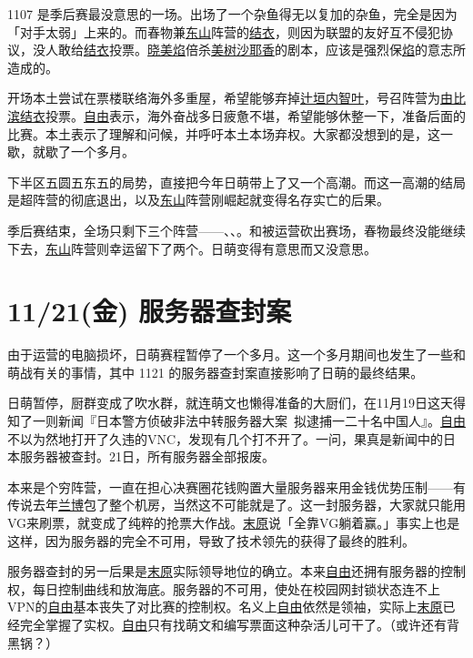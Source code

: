 1107 是季后赛最没意思的一场。出场了一个杂鱼得无以复加的杂鱼，完全是因为「对手太弱」上来的。而春物兼\uline{东山}阵营的\uline{结衣}，则因为联盟的友好互不侵犯协议，没人敢给\uline{结衣}投票。\uline{晓美焰}倍杀\uline{美树沙耶香}的剧本，应该是强烈保\uline{焰}的意志所造成的。

开场本土尝试在票楼联络海外多重屋，希望能够弃掉\uline{辻垣内智叶}，号召阵营为\uline{由比滨结衣}投票。\uline{自由}表示，海外奋战多日疲惫不堪，希望能够休整一下，准备后面的比赛。本土表示了理解和问候，并呼吁本土本场弃权。大家都没想到的是，这一歇，就歇了一个多月。

下半区五圆五东五的局势，直接把今年日萌带上了又一个高潮。而这一高潮的结局是超阵营的彻底退出，以及\uline{东山}阵营刚崛起就变得名存实亡的后果。

季后赛结束，全场只剩下三个阵营——、、。和被运营砍出赛场，春物最终没能继续下去，\uline{东山}阵营则幸运留下了两个。日萌变得有意思而又没意思。
\newpage
\section{11/21(金) 服务器查封案}

由于运营的电脑损坏，日萌赛程暂停了一个多月。这一个多月期间也发生了一些和萌战有关的事情，其中 1121 的服务器查封案直接影响了日萌的最终结果。

日萌暂停，厨群变成了吹水群，就连萌文也懒得准备的大厨们，在11月19日这天得知了一则新闻『日本警方侦破非法中转服务器大案~拟逮捕一二十名中国人』。\uline{自由}不以为然地打开了久违的VNC，发现有几个打不开了。一问，果真是新闻中的日本服务器被查封。21日，所有服务器全部报废。

本来是个穷阵营，一直在担心决赛圈花钱购置大量服务器来用金钱优势压制——有传说去年\uline{兰博}包了整个机房，当然这不可能就是了。这一封服务器，大家就只能用VG来刷票，就变成了纯粹的抢票大作战。\uline{末原}说「全靠VG躺着赢。」事实上也是这样，因为服务器的完全不可用，导致了技术领先的获得了最终的胜利。

服务器查封的另一后果是\uline{末原}实际领导地位的确立。本来\uline{自由}还拥有服务器的控制权，每日控制曲线和放海底。服务器的不可用，使处在校园网封锁状态连不上VPN的\uline{自由}基本丧失了对比赛的控制权。名义上\uline{自由}依然是领袖，实际上\uline{末原}已经完全掌握了实权。\uline{自由}只有找萌文和编写票面这种杂活儿可干了。（或许还有背黑锅？）

